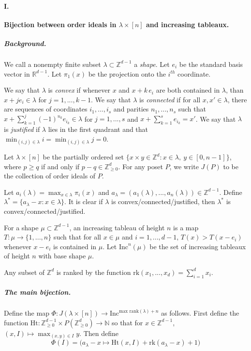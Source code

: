 \documentclass[10pt,letter]{article}
\begin{document}
\paragraph*{I.} \textbf{Bijection between order ideals in $\lambda \times [n]$ and increasing tableaux.} 

\subparagraph*{Background.}

We call a nonempty finite subset $\lambda \subset \mathbb{Z}^{d-1}$ a \textit{shape}. Let $e_i$ be the standard basis vector in $\mathbb{R}^{d-1}$. Let $\pi_1(x)$ be the projection onto the $i^{th}$ coordinate.

We say that $\lambda$ is \textit{convex} if whenever $x$ and $x + k \, e_i$ are both contained in $\lambda$, than $x + j e_i \in \lambda$ for $j = 1,...,k-1$.  We say that $\lambda$ is \textit{connected} if for all $x,x' \in \lambda$, there are sequences of coordinates $i_1,...,i_s$ and parities $n_1,...,n_s$ such that $x + \sum_{k=1}^j (-1)^{n_k} e_{i_k} \in \lambda$ for $j = 1,...,s$ and $x + \sum_{k=1}^s e_{i_k} = x'$.  We say that $\lambda$ is \textit{justified} if $\lambda$ lies in the first quadrant and that $\min_{(i,j) \in \lambda} i = \min_{(i,j) \in \lambda} j = 0$. 

Let $\lambda \times [n]$ be the partially ordered set $\lbrace x \times y \in \mathbb{Z}^{d}: x \in \lambda, \ y \in [0,n-1] \rbrace$, where $p \geq q$ if and only if $p -q \in \mathbb{Z}_{\geq 0}^d$. For any poset $P$, we write $J(P)$ to be the collection of order ideals of $P$. 

Let $a_i(\lambda) = \max_{x \in \lambda} \pi_i(x)$ and $a_\lambda = (a_1(\lambda),...,a_n(\lambda)) \in \mathbb{Z}^{d-1}$. Define $\lambda^{\ast} = \lbrace a_\lambda - x: x \in \lambda \rbrace$. It is clear if $\lambda$ is convex/connected/justified, then $\lambda^{\ast}$ is convex/connected/justified. 

For a shape $\mu \subset \mathbb{Z}^{d-1}$, an increasing tableau of height $n$ is a map $T: \mu \rightarrow \lbrace 1,...,n \rbrace$ such that for all $x \in \mu$ and $i = 1,...,{d-1}$, $T(x) > T(x-e_i)$ whenever $x-e_i$ is contained in $\mu$. Let $\text{Inc}^n(\mu)$ be the set of increasing tableaux of height $n$ with base shape $\mu$. 

Any subset of $\mathbb{Z}^d$ is ranked by the function $\text{rk}(x_1,...,x_d) = \sum_{i=1}^d x_i$.

\subparagraph*{The main bijection.}   Define the map $\Phi: J(\lambda \times [n]) \rightarrow \text{Inc}^{\text{max rank}(\lambda)+ n}$ as follows. First define the function $\text{Ht}: \mathbb{Z}_{\geq 0}^{d-1} \times P(\mathbb{Z}_{\geq 0}^d) \rightarrow \mathbb{N}$ so that for $x \in \mathbb{Z}^{d-1}$, $(x,I) \mapsto \max_{(x,y) \in I} y$.  Then define 
\begin{equation*}
\Phi(I) = \bigg( a_{\lambda} - x \mapsto \text{Ht}(x,I) + \text{rk}(a_{\lambda}-x) + 1 \bigg)
\end{equation*}
\end{document}
